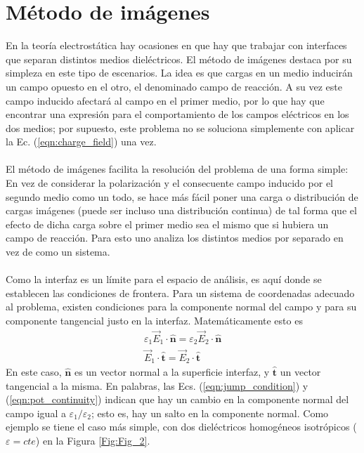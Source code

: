 \documentclass[12pt, oneside, numbers, spanish]{ezthesis}
\numberwithin{equation}{section}
\begin{document}
\section{Método de imágenes}\label{Sec:Image_Method}
En la teoría electrostática hay ocasiones en que hay que trabajar con interfaces que separan distintos medios dieléctricos. El método de imágenes destaca por su simpleza en este tipo de escenarios. La idea es que cargas en un medio inducirán un campo opuesto en el otro, el denominado campo de reacción. A su vez este campo inducido afectará al campo en el primer medio, por lo que hay que encontrar una expresión para el comportamiento de los campos eléctricos en los dos medios; por supuesto, este problema no se soluciona simplemente con aplicar la Ec. (\ref{eqn:charge_field}) una vez.\\\\
El método de imágenes facilita la resolución del problema de una forma simple: En vez de considerar la polarización y el consecuente campo inducido por el segundo medio como un todo, se hace más fácil poner una carga o distribución de cargas imágenes (puede ser incluso una distribución continua) de tal forma que el efecto de dicha carga sobre el primer medio sea el mismo que si hubiera un campo de reacción. Para esto uno analiza los distintos medios por separado en vez de como un sistema.\\\\
Como la interfaz es un límite para el espacio de análisis, es aquí donde se establecen las condiciones de frontera. Para un sistema de coordenadas adecuado al problema, existen condiciones para la componente normal del campo y para su componente tangencial justo en la interfaz. Matemáticamente esto es
\begin{gather}
\varepsilon_1\vec{E}_1\cdot\hat{\mathbf{n}} = \varepsilon_2\vec{E}_2\cdot\hat{\mathbf{n}} \label{eqn:jump_condition}\\
\vec{E}_1\cdot\hat{\mathbf{t}} = \vec{E}_2\cdot\hat{\mathbf{t}} \label{eqn:pot_continuity}
\end{gather}
En este caso, $\hat{\mathbf{n}}$ es un vector normal a la superficie interfaz, y $\hat{\mathbf{t}}$ un vector tangencial a la misma. En palabras, las Ecs. (\ref{eqn:jump_condition}) y (\ref{eqn:pot_continuity}) indican que hay un cambio en la componente normal del campo igual a $\varepsilon_1/\varepsilon_2$; esto es, hay un salto en la componente normal. Como ejemplo se tiene el caso más simple, con dos dieléctricos homogéneos isotrópicos ($\varepsilon = cte$) en la Figura \ref{Fig:Fig_2}.
\end{document}
